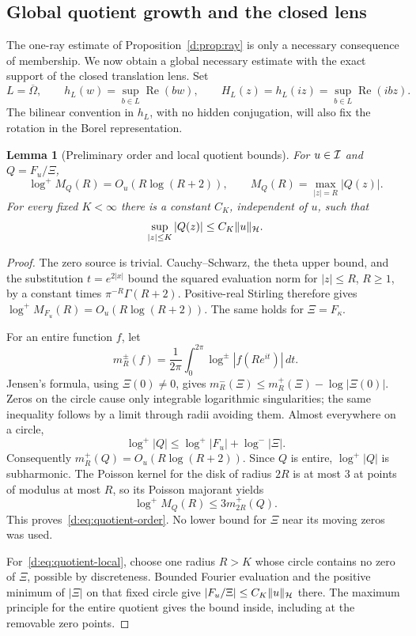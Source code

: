 \documentclass[11pt,a4paper]{article}
\numberwithin{equation}{section}
\newtheorem{lemma}[theorem]{Lemma}
\theoremstyle{definition}\newtheorem{definition}[theorem]{Definition}
\theoremstyle{remark}\newtheorem{remark}[theorem]{Remark}
\newcommand{\Hh}{\mathcal H}\newcommand{\Hw}{\mathcal H}
\begin{document}
\subsection{Global quotient growth and the closed lens}\label{d:sec:global-growth}

The one-ray estimate of Proposition~\ref{d:prop:ray} is only a necessary consequence of membership. We now obtain a global necessary estimate with the exact support of the closed translation lens. Set
\begin{equation}\label{d:eq:closed-lens}
 L=\overline\Omega,\qquad
 h_L(w)=\sup_{b\in L}\operatorname{Re}(bw),\qquad
 H_L(z)=h_L(iz)=\sup_{b\in L}\operatorname{Re}(ibz).
\end{equation}
The bilinear convention in $h_L$, with no hidden conjugation, will also fix the rotation in the Borel representation.

\begin{lemma}[Preliminary order and local quotient bounds]\label{d:lem:quotient-order}
For $u\in\mathcal I$ and $Q=F_u/\Xi$,
\begin{equation}\label{d:eq:quotient-order}
 \log^+M_Q(R)=O_u(R\log(R+2)),
 \qquad M_Q(R)=\max_{|z|=R}|Q(z)|.
\end{equation}
For every fixed $K<\infty$ there is a constant $C_K$, independent of $u$, such that
\begin{equation}\label{d:eq:quotient-local}
 \sup_{|z|\le K}|Q(z)|\le C_K\norm{u}_{\Hh}.
\end{equation}
\end{lemma}
\begin{proof}
The zero source is trivial. Cauchy--Schwarz, the theta upper bound, and the substitution $t=e^{2|x|}$ bound the squared evaluation norm for $|z|\le R$, $R\ge1$, by a constant times $\pi^{-R}\Gamma(R+2)$. Positive-real Stirling therefore gives
$\log^+M_{F_u}(R)=O_u(R\log(R+2))$. The same holds for $\Xi=F_\kappa$.

For an entire function $f$, let
\[
 m_R^\pm(f)=\frac1{2\pi}\int_0^{2\pi}\log^\pm|f(Re^{it})|\,dt.
\]
Jensen's formula, using $\Xi(0)\ne0$, gives
$m_R^-(\Xi)\le m_R^+(\Xi)-\log|\Xi(0)|$. Zeros on the circle cause only integrable logarithmic singularities; the same inequality follows by a limit through radii avoiding them. Almost everywhere on a circle,
\[
 \log^+|Q|\le\log^+|F_u|+\log^-|\Xi|.
\]
Consequently $m_R^+(Q)=O_u(R\log(R+2))$. Since $Q$ is entire, $\log^+|Q|$ is subharmonic. The Poisson kernel for the disk of radius $2R$ is at most $3$ at points of modulus at most $R$, so its Poisson majorant yields
\[
 \log^+M_Q(R)\le3m_{2R}^+(Q).
\]
This proves~\eqref{d:eq:quotient-order}. No lower bound for $\Xi$ near its moving zeros was used.

For~\eqref{d:eq:quotient-local}, choose one radius $R>K$ whose circle contains no zero of $\Xi$, possible by discreteness. Bounded Fourier evaluation and the positive minimum of $|\Xi|$ on that fixed circle give
$|F_u/\Xi|\le C_K\norm{u}_{\Hh}$ there. The maximum principle for the entire quotient gives the bound inside, including at the removable zero points.
\end{proof}
\end{document}

